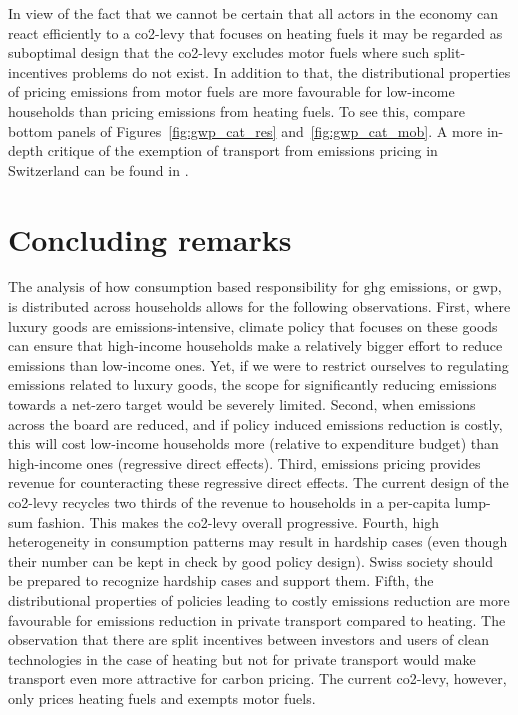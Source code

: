 \documentclass[a4paper,11pt,abstract=true]{scrartcl}
\begin{document}
In view of the fact that we cannot be certain that all actors in the economy can react efficiently to a \ac{co2}-levy that focuses on heating fuels it may be regarded as suboptimal design that the \ac{co2}-levy excludes motor fuels where such split-incentives problems do not exist.
In addition to that, the distributional properties of pricing emissions from  motor fuels are more favourable for low-income households than pricing emissions from heating fuels.
To see this, compare bottom panels of Figures~\ref{fig:gwp_cat_res} and~\ref{fig:gwp_cat_mob}.
A more in-depth critique of the exemption of transport from emissions pricing in Switzerland can be found in \citet{landis_differentiated_2018}.


\section{Concluding remarks}
\label{sec:conclusion}

The analysis of how consumption based responsibility for \ac{ghg} emissions, or \ac{gwp}, is distributed across households allows for the following observations.
First, where luxury goods are emissions-intensive, climate policy that focuses on these goods can ensure that high-income households make a relatively bigger effort to reduce emissions than low-income ones.
Yet, if we were to restrict ourselves to regulating emissions related to luxury goods, the scope for significantly reducing emissions towards a net-zero target would be severely limited.
Second, when emissions across the board are reduced, and if policy induced emissions reduction is costly, this will cost low-income households more (relative to expenditure budget) than high-income ones (regressive direct effects).
Third, emissions pricing provides revenue for counteracting these regressive direct effects.
The current design of the \ac{co2}-levy recycles two thirds of the revenue to households in a per-capita lump-sum fashion.
This makes the \ac{co2}-levy overall progressive.
Fourth, high heterogeneity in consumption patterns may result in hardship cases (even though their number can be kept in check by good policy design).
Swiss society should be prepared to recognize hardship cases and support them.
Fifth, the distributional properties of policies leading to costly emissions reduction are more favourable for emissions reduction in private transport compared to heating.
The observation that there are split incentives between investors and users of clean technologies in the case of heating but not for private transport would make transport even more attractive for carbon pricing.
The current \ac{co2}-levy, however, only prices heating fuels and exempts motor fuels.
\end{document}
